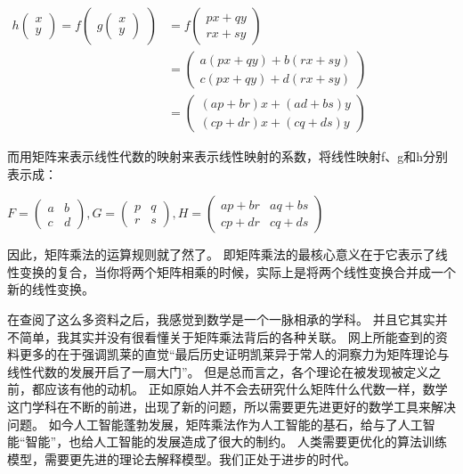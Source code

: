\documentclass[12pt,a4paper]{article}%
\begin{document}
\begin{center}
$
\begin{aligned}
h\begin{pmatrix}
    x \\
    y
\end{pmatrix}=f\begin{pmatrix}
    g\begin{pmatrix}
        x \\
        y
    \end{pmatrix}
\end{pmatrix}&=f\begin{pmatrix}
    px+qy \\
    rx+sy
\end{pmatrix}\\&=
\begin{pmatrix}
    a(px+qy)+b(rx+sy) \\
    c(px+qy)+d(rx+sy)
\end{pmatrix}
    \\&=
    \begin{pmatrix}
        (ap+br)x+(ad+bs)y \\
        (cp+dr)x+(cq+ds)y
    \end{pmatrix}
\end{aligned}
$
\end{center}
而用矩阵来表示线性代数的映射来表示线性映射的系数，将线性映射f、g和h分别表示成：

\begin{center}
$
F=\begin{pmatrix}
    a & b \\
    c & d
\end{pmatrix}, G=\begin{pmatrix}
    p & q \\
    r & s
\end{pmatrix}, H=\begin{pmatrix}
    ap+br & aq+bs \\
    cp+dr & cq+ds
\end{pmatrix}
$
\end{center}

因此，矩阵乘法的运算规则就了然了。
即矩阵乘法的最核心意义在于它表示了线性变换的复合，当你将两个矩阵相乘的时候，实际上是将两个线性变换合并成一个新的线性变换。

在查阅了这么多资料之后，我感觉到数学是一个一脉相承的学科。
并且它其实并不简单，我其实并没有很看懂关于矩阵乘法背后的各种关联。
网上所能查到的资料更多的在于强调凯莱的直觉“最后历史证明凯莱异于常人的洞察力为矩阵理论与线性代数的发展开启了一扇大门”。
但是总而言之，各个理论在被发现被定义之前，都应该有他的动机。
正如原始人并不会去研究什么矩阵什么代数一样，数学这门学科在不断的前进，出现了新的问题，所以需要更先进更好的数学工具来解决问题。
如今人工智能蓬勃发展，矩阵乘法作为人工智能的基石，给与了人工智能“智能”，也给人工智能的发展造成了很大的制约。
人类需要更优化的算法训练模型，需要更先进的理论去解释模型。我们正处于进步的时代。
\end{document}
